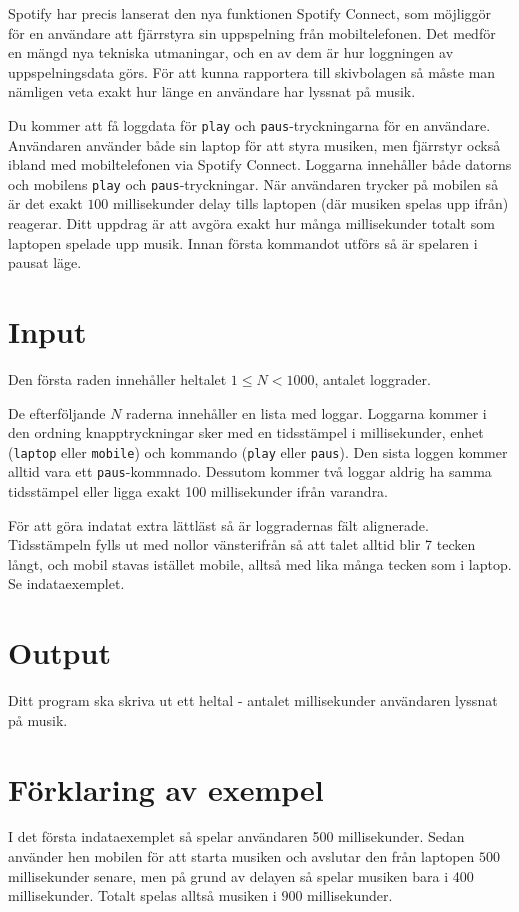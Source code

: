 
Spotify har precis lanserat den nya funktionen Spotify Connect, som möjliggör för
en användare att fjärrstyra sin uppspelning från mobiltelefonen. Det medför en
mängd nya tekniska utmaningar, och en av dem är hur loggningen av uppspelningsdata görs.
För att kunna rapportera till skivbolagen så måste man nämligen veta exakt hur länge
en användare har lyssnat på musik.

Du kommer att få loggdata för \texttt{play} och \texttt{paus}-tryckningarna
för en användare. Användaren använder både sin laptop för att styra musiken, men
fjärrstyr också ibland med mobiltelefonen via Spotify Connect. Loggarna innehåller både
datorns och mobilens \texttt{play} och \texttt{paus}-tryckningar. När användaren trycker
på mobilen så är det exakt $100$ millisekunder delay tills laptopen
(där musiken spelas upp ifrån) reagerar. Ditt uppdrag är att
avgöra exakt hur många millisekunder totalt som laptopen spelade upp musik.
Innan första kommandot utförs så är spelaren i pausat läge.

\section*{Input}
Den första raden innehåller heltalet $1 \le N < 1000$, antalet loggrader.

De efterföljande $N$ raderna innehåller en lista med loggar. Loggarna kommer
i den ordning knapptryckningar sker med en tidsstämpel i millisekunder, enhet
(\texttt{laptop} eller \texttt{mobile}) och kommando (\texttt{play} eller \texttt{paus}). Den
sista loggen kommer
alltid vara ett \texttt{paus}-kommnado. Dessutom kommer två loggar aldrig ha samma
tidsstämpel eller ligga exakt 100 millisekunder ifrån varandra.

För att göra indatat extra lättläst så är loggradernas fält
alignerade. Tidsstämpeln fylls ut med nollor vänsterifrån så att talet
alltid blir 7 tecken långt, och mobil stavas istället mobile, alltså med lika
många tecken som i laptop. Se indataexemplet.

\section*{Output}
Ditt program ska skriva ut ett heltal - antalet millisekunder användaren lyssnat på musik.

\section*{Förklaring av exempel}
I det första indataexemplet så spelar användaren 500 millisekunder. Sedan använder hen
mobilen för att starta musiken och avslutar den från laptopen $500$ millisekunder
senare, men på grund av delayen så spelar musiken bara i 400 millisekunder.
Totalt spelas alltså musiken i $900$ millisekunder.

